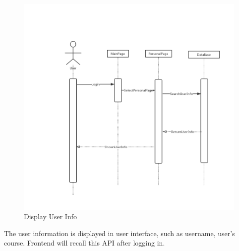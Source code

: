 \documentclass[16pt]{scrreprt}
\begin{document}
\begin{figure}[H]
    \includegraphics[width=\linewidth]{./FuncPhoto/3.png}   
    \caption{Display User Info}
\end{figure}
The user information is displayed in user interface, such as username, user's course. Frontend will recall this API after logging in.
\end{document}
